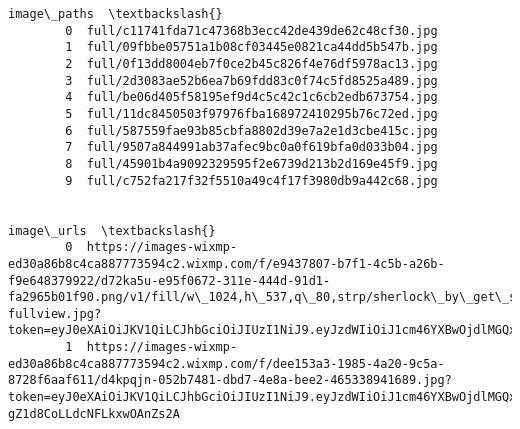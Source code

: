 \documentclass[11pt]{article}
\begin{document}
\begin{Verbatim}[commandchars=\\\{\}]
                                                 image\_paths  \textbackslash{}
        0  full/c11741fda71c47368b3ecc42de439de62c48cf30.jpg   
        1  full/09fbbe05751a1b08cf03445e0821ca44dd5b547b.jpg   
        2  full/0f13dd8004eb7f0ce2b45c826f4e76df5978ac13.jpg   
        3  full/2d3083ae52b6ea7b69fdd83c0f74c5fd8525a489.jpg   
        4  full/be06d405f58195ef9d4c5c42c1c6cb2edb673754.jpg   
        5  full/11dc8450503f97976fba168972410295b76c72ed.jpg   
        6  full/587559fae93b85cbfa8802d39e7a2e1d3cbe415c.jpg   
        7  full/9507a844991ab37afec9bc0a0f619bfa0d033b04.jpg   
        8  full/45901b4a9092329595f2e6739d213b2d169e45f9.jpg   
        9  full/c752fa217f32f5510a49c4f17f3980db9a442c68.jpg   
        
                                                                                                                                                                                                                                                                                                                                                                                                                                                                                                                                                                                                                                                                                                                                                   image\_urls  \textbackslash{}
        0  https://images-wixmp-ed30a86b8c4ca887773594c2.wixmp.com/f/e9437807-b7f1-4c5b-a26b-f9e648379922/d72ka5u-e95f0672-311e-444d-91d1-fa2965b01f90.png/v1/fill/w\_1024,h\_537,q\_80,strp/sherlock\_by\_get\_sherlock\_d72ka5u-fullview.jpg?token=eyJ0eXAiOiJKV1QiLCJhbGciOiJIUzI1NiJ9.eyJzdWIiOiJ1cm46YXBwOjdlMGQxODg5ODIyNjQzNzNhNWYwZDQxNWVhMGQyNmUwIiwiaXNzIjoidXJuOmFwcDo3ZTBkMTg4OTgyMjY0MzczYTVmMGQ0MTVlYTBkMjZlMCIsIm9iaiI6W1t7ImhlaWdodCI6Ijw9NTM3IiwicGF0aCI6IlwvZlwvZTk0Mzc4MDctYjdmMS00YzViLWEyNmItZjllNjQ4Mzc5OTIyXC9kNzJrYTV1LWU5NWYwNjcyLTMxMWUtNDQ0ZC05MWQxLWZhMjk2NWIwMWY5MC5wbmciLCJ3aWR0aCI6Ijw9MTAyNCJ9XV0sImF1ZCI6WyJ1cm46c2VydmljZTppbWFnZS5vcGVyYXRpb25zIl19.y4LtbGzQLxiWRZVSYC3OuJMVbv6XfvgSIGkGIzv47XU                                     
        1  https://images-wixmp-ed30a86b8c4ca887773594c2.wixmp.com/f/dee153a3-1985-4a20-9c5a-8728f6aaf611/d4kpqjn-052b7481-dbd7-4e8a-bee2-465338941689.jpg?token=eyJ0eXAiOiJKV1QiLCJhbGciOiJIUzI1NiJ9.eyJzdWIiOiJ1cm46YXBwOjdlMGQxODg5ODIyNjQzNzNhNWYwZDQxNWVhMGQyNmUwIiwiaXNzIjoidXJuOmFwcDo3ZTBkMTg4OTgyMjY0MzczYTVmMGQ0MTVlYTBkMjZlMCIsIm9iaiI6W1t7InBhdGgiOiJcL2ZcL2RlZTE1M2EzLTE5ODUtNGEyMC05YzVhLTg3MjhmNmFhZjYxMVwvZDRrcHFqbi0wNTJiNzQ4MS1kYmQ3LTRlOGEtYmVlMi00NjUzMzg5NDE2ODkuanBnIn1dXSwiYXVkIjpbInVybjpzZXJ2aWNlOmZpbGUuZG93bmxvYWQiXX0.MGdgMPuuE2eZiv6yrT-gZ1d8CoLLdcNFLkxwOAnZs2A                                                                                                                                                                   

\end{Verbatim}
\end{document}
